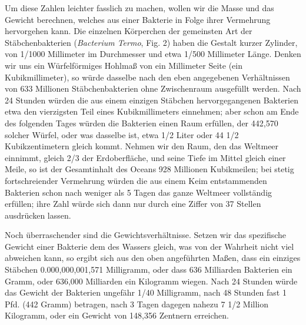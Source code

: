 \documentclass[a4paper, 11pt, oneside, english]{article}
\begin{document}
Um diese Zahlen leichter fasslich zu machen, wollen wir die Masse und das Gewicht berechnen, welches aus einer Bakterie in Folge ihrer Vermehrung hervorgehen kann. Die einzelnen Körperchen der gemeinsten Art der Stäbchenbakterien (\emph{Bacterium Termo}, Fig. 2) haben die Gestalt kurzer Zylinder, von 1/1000 Millimeter im Durchmesser und etwa 1/500 Millimeter Länge. Denken wir uns ein Würfelförmiges Hohlmaß von ein Millimeter Seite (ein Kubikmillimeter), so würde dasselbe nach den eben angegebenen Verhältnissen von 633 Millionen Stäbchenbakterien ohne Zwischenraum ausgefüllt werden. Nach 24 Stunden würden die aus einem einzigen Stäbchen hervorgegangenen Bakterien etwa den vierzigsten Teil eines Kubikmillimeters einnehmen; aber schon am Ende des folgenden Tages würden die Bakterien einen Raum erfüllen, der 442,570 solcher Würfel, oder was dasselbe ist, etwa 1/2 Liter oder 44 1/2 Kubikzentimetern gleich kommt. Nehmen wir den Raum, den das Weltmeer einnimmt, gleich 2/3 der Erdoberfläche, und seine Tiefe im Mittel gleich einer Meile, so ist der Gesamtinhalt des Oceans 928 Millionen Kubikmeilen; bei stetig fortschreiender Vermehrung würden die aus einem Keim entstammenden Bakterien schon nach weniger als 5 Tagen das ganze Weltmeer vollständig erfüllen; ihre Zahl würde sich dann nur durch eine Ziffer von 37 Stellen ausdrücken lassen.

Noch überraschender sind die Gewichtsverhältnisse. Setzen wir das spezifische Gewicht einer Bakterie dem des Wassers gleich, was von der Wahrheit nicht viel abweichen kann, so ergibt sich aus den oben angeführten Maßen, dass ein einziges Stäbchen 0.000,000,001,571 Milligramm, oder dass 636 Milliarden Bakterien ein Gramm, oder 636,000 Milliarden ein Kilogramm wiegen. Nach 24 Stunden würde das Gewicht der Bakterien ungefähr 1/40 Milligramm, nach 48 Stunden fast 1 Pfd. (442 Gramm) betragen, nach 3 Tagen dagegen nahezu 7 1/2 Million Kilogramm, oder ein Gewicht von 148,356 Zentnern erreichen.
\end{document}
